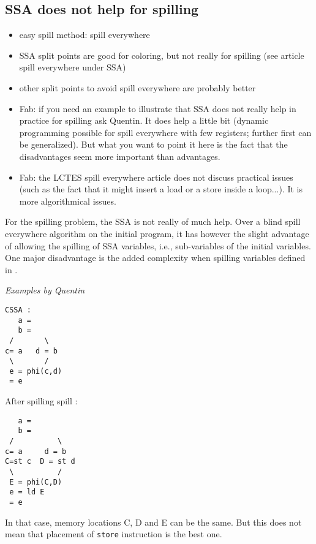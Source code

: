 {\subsection{SSA does not help for spilling}
{\sl
\begin{itemize}
  \item easy spill method: spill everywhere
  \item SSA split points are good for coloring, but not really for spilling 
    (see article spill everywhere under SSA)
  \item other split points to avoid spill everywhere are probably better
  \item Fab: if you need an example to illustrate that SSA does not really help 
    in practice for spilling ask Quentin. It does help a little bit (dynamic 
    programming possible for spill everywhere with few registers; further first 
    can be generalized). But what you want to point it here is the fact that 
    the disadvantages seem more important than advantages.
  \item Fab: the LCTES spill everywhere article does not discuss practical issues (such as the fact that it might insert a load or a store inside a loop...). It is more algorithmical issues.
\end{itemize}
}

For the spilling problem, the SSA is not really of much help. Over a blind 
spill everywhere algorithm on the initial program, it has however the slight 
advantage of allowing the spilling of SSA variables, i.e., sub-variables of the 
initial variables. One major disadvantage is the added complexity when spilling
variables defined in \phifuns {}.

{\sl Examples by Quentin}
\begin{minipage}{.45\textwidth}
\begin{verbatim}
CSSA :
   a =
   b =
 /       \
c= a   d = b
 \       /
 e = phi(c,d)
 = e
\end{verbatim}
\end{minipage}
\begin{minipage}{.45\textwidth}
After spilling spill :
\begin{verbatim}
   a =
   b =
 /          \
c= a     d = b
C=st c  D = st d
 \          /
 E = phi(C,D)
 e = ld E
 = e
\end{verbatim}
\end{minipage}
In that case, memory locations C, D and E can be the same. But this does not 
mean that placement of {\tt store} instruction is the best one.

}
